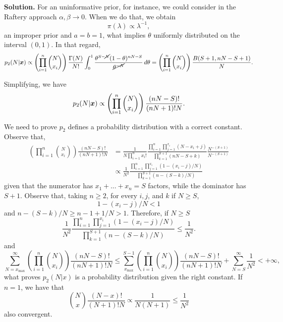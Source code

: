 \vspace{2ex}

    {\bf Solution.} For an uninformative prior, for instance, we could
    consider in the Raftery approach $\alpha, \beta \to 0$. When we do that,
    we obtain 
    $$
    \pi(\lambda) \propto \lambda^{-1},
    $$
    an improper prior and $a = b = 1$,  what implies $\theta$ uniformly
    distributed on the interval $(0,1)$. In that regard, 
    \begin{equation*}
        p_2(N|\boldsymbol{x}) \propto \left(\prod_{i=1}^n \binom{N}{x_i}\right)\frac{\Gamma(N)}{N!} \int_0^1 \frac{\theta^{S-\cancel{N}}(1-\theta)^{nN-S}}{\cancel{\theta^{-N}}} \, d\theta = \left(\prod_{i=1}^n \binom{N}{x_i}\right)\frac{B(S+1,nN-S+1)}{N} .
    \end{equation*}

    Simplifying, we have 
    \begin{equation}
        \label{eq:p2-posterior}
        p_2(N|\boldsymbol{x}) \propto \left(\prod_{i=1}^n \binom{N}{x_i}\right)\frac{(nN-S)!}{(nN+1)!N}.
    \end{equation}
 
    We need to prove $p_2$ defines a probability distribution with a correct
    constant. 
    Observe that, 
    \begin{equation*}
        \begin{split}
        \left(\prod_{i=1}^n \binom{N}{x_i}\right)\frac{(nN-S)!}{(nN+1)!N} &= \frac{1}{N\prod_{i=1}^n x_i!}\frac{\prod_{i=1}^n\prod_{j=1}^{x_i} (N - x_i + j)}{\prod_{k=1}^{S+1}(nN - S + k)}\frac{N^{-(S+1)}}{N^{-(S+1)}}  \\
        &\propto \frac{1}{N^2}\frac{\prod_{i=1}^n\prod_{j=1}^{x_i} (1 - (x_i - j)/N)}{\prod_{k=1}^{S+1}(n - (S - k)/N)} 
        \end{split}
    \end{equation*}
    given that the numerator has $x_1 + ... + x_n = S$ factors, while the dominator has $S+1$. Observe that, taking $n \ge 2$, for every $i, j$, and $k$ if $N
    \ge S$, 
    $$
    1 - (x_i - j)/N < 1
    $$
    and $n - (S - k)/N \ge n - 1 + 1/N > 1$. Therefore, if $N \ge S$
    $$
    \frac{1}{N^2}\frac{\prod_{i=1}^n\prod_{j=1}^{x_i} (1 - (x_i - j)/N)}{\prod_{k=1}^{S+1}(n - (S - k)/N)} \le \frac{1}{N^2}.
    $$
    and 
    $$
    \sum_{N=x_{\max}}^{\infty} \left(\prod_{i=1}^n \binom{N}{x_i}\right)\frac{(nN-S)!}{(nN+1)!N} \le \sum_{x_{\max}}^{S-1} \left(\prod_{i=1}^n \binom{N}{x_i}\right)\frac{(nN-S)!}{(nN+1)!N} + \sum_{N=S}^{\infty} \frac{1}{N^2} < +\infty,
    $$
    what proves $p_2(N|x)$ is a probability distribution given the right
    constant. If $n=1$, we have that 
    $$
    \binom{N}{x}\frac{(N-x)!}{(N+1)!N} \propto \frac{1}{N(N+1)} \le \frac{1}{N^2}
    $$
    also convergent.